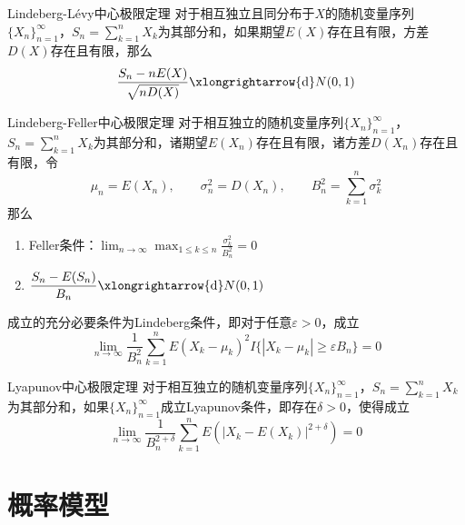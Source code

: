 \documentclass[lang = cn, scheme = chinese, thmcnt = section]{elegantbook}
\newcommand{\tod}{\xlongrightarrow{\mathrm{d}}}
\newcommand{\dis}{\displaystyle}
\begin{document}
\begin{theorem}{Lindeberg-Lévy中心极限定理}
	对于相互独立且同分布于$X$的随机变量序列$\{ X_n \}_{n=1}^{\infty}$，$\dis S_n=\sum_{k=1}^{n}X_k$为其部分和，如果期望$E(X)$存在且有限，方差$D(X)$存在且有限，那么%
	$$
	\frac{S_n-n E(X)}{\sqrt{nD(X)}}\tod N(0,1)
	$$
\end{theorem}

\begin{theorem}{Lindeberg-Feller中心极限定理}
	对于相互独立的随机变量序列$\{ X_n \}_{n=1}^{\infty}$，$\dis S_n=\sum_{k=1}^{n}X_k$为其部分和，诸期望$E(X_n)$存在且有限，诸方差$D(X_n)$存在且有限，令%
	$$
	\mu_n=E(X_n),\qquad
	\sigma_n^2=D(X_n),\qquad
	B_n^2=\sum_{k=1}^{n}\sigma_k^2
	$$
	那么
	\begin{enumerate}
		\item Feller条件：$\dis\lim_{n\to\infty}\max_{1\le k\le n}\frac{\sigma_k^2}{B_n^2}=0$
		\item $\dis\frac{S_n-E(S_n)}{B_n}\tod N(0,1)$
	\end{enumerate}
	成立的充分必要条件为Lindeberg条件，即对于任意$\varepsilon>0$，成立%
	$$
	\lim_{n\to\infty}\frac{1}{B_n^2}\sum_{k=1}^{n}E(X_k-\mu_k)^2I\{ |X_k-\mu_k|\ge\varepsilon B_n \}=0
	$$
\end{theorem}

\begin{theorem}{Lyapunov中心极限定理}
	对于相互独立的随机变量序列$\{ X_n \}_{n=1}^{\infty}$，$\dis S_n=\sum_{k=1}^{n}X_k$为其部分和，如果$\{ X_n \}_{n=1}^{\infty}$成立Lyapunov条件，即存在$\delta>0$，使得成立%
	$$
	\lim_{n\to\infty}\frac{1}{B_n^{2+\delta}}\sum_{k=1}^{n}E(|X_k-E(X_k)|^{2+\delta})=0
	$$
\end{theorem}

\chapter{概率模型}
\end{document}
